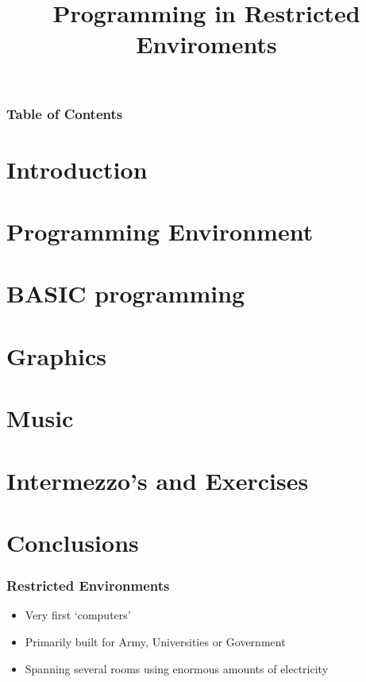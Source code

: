 \documentclass[aspectratio=43]{uva-inf-presentation}
\title{Programming in Restricted Enviroments}
\begin{document}
\begin{titelframe}
\titlepage

\end{titelframe}

\begin{frame}
\frametitle{Table of Contents}
\tableofcontents
\end{frame}

\section{Introduction}
\section{Programming Environment}
\section{BASIC programming}
\section{Graphics}
\section{Music}
\section{Intermezzo's and Exercises}

\section{Conclusions}


\begin{frame}
\frametitle{Restricted Environments}

\begin{itemize}
\item Very first `computers'
\item Primarily built for Army, Universities or Government
\item Spanning several rooms using enormous amounts of electricity
\end{itemize}

\end{frame}

\end{document}
